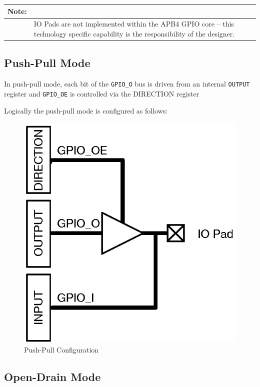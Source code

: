 \begin{longtable}[]{@{}|p{2cm}p{12cm}@{}}
	\textbf{Note:} & \\
	\endhead
	 & IO Pads are not implemented within the APB4 GPIO core --
	this technology specific capability is the responsibility of the
	designer.\\
\end{longtable}

\subsection{Push-Pull Mode}\label{push-pull-mode}

In push-pull mode, each bit of the \texttt{GPIO\_O} bus is driven from an internal \texttt{OUTPUT}
register and \texttt{GPIO\_OE} is controlled via the
DIRECTION register

Logically the push-pull mode is configured as follows:

\begin{figure}[tbh]
	\centering
	\includegraphics{assets/img/apb4-gpio-pp}
	\caption{Push-Pull Configuration}
	\label{fig:apb4-gpio-pp}
\end{figure}


\subsection{Open-Drain Mode}\label{open-drain-mode}

